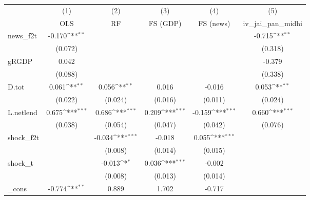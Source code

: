{
\def\sym#1{\ifmmode^{#1}\else\(^{#1}\)\fi}
\begin{tabular}{l*{5}{c}}
\toprule
            &\multicolumn{1}{c}{(1)}&\multicolumn{1}{c}{(2)}&\multicolumn{1}{c}{(3)}&\multicolumn{1}{c}{(4)}&\multicolumn{1}{c}{(5)}\\
            &\multicolumn{1}{c}{OLS}&\multicolumn{1}{c}{RF}&\multicolumn{1}{c}{FS (GDP)}&\multicolumn{1}{c}{FS (news)}&\multicolumn{1}{c}{iv\_jai\_pan\_midhi}\\
\midrule
news\_f2t    &      -0.170\sym{**} &                     &                     &                     &      -0.715\sym{**} \\
            &     (0.072)         &                     &                     &                     &     (0.318)         \\
\addlinespace
gRGDP       &       0.042         &                     &                     &                     &      -0.379         \\
            &     (0.088)         &                     &                     &                     &     (0.338)         \\
\addlinespace
D.tot       &       0.061\sym{**} &       0.056\sym{**} &       0.016         &      -0.016         &       0.053\sym{**} \\
            &     (0.022)         &     (0.024)         &     (0.016)         &     (0.011)         &     (0.024)         \\
\addlinespace
L.netlend   &       0.675\sym{***}&       0.686\sym{***}&       0.209\sym{***}&      -0.159\sym{***}&       0.660\sym{***}\\
            &     (0.038)         &     (0.054)         &     (0.047)         &     (0.042)         &     (0.076)         \\
\addlinespace
shock\_f2t   &                     &      -0.034\sym{***}&      -0.018         &       0.055\sym{***}&                     \\
            &                     &     (0.008)         &     (0.014)         &     (0.015)         &                     \\
\addlinespace
shock\_t     &                     &      -0.013\sym{*}  &       0.036\sym{***}&      -0.002         &                     \\
            &                     &     (0.008)         &     (0.013)         &     (0.014)         &                     \\
\addlinespace
\_cons      &      -0.774\sym{**} &       0.889         &       1.702         &      -0.717         &                     \\

\end{tabular}}
